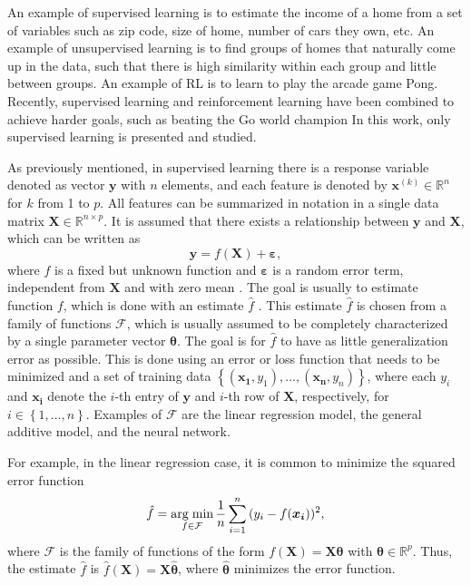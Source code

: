An example of supervised learning is to estimate the income of a home from a set of variables such as zip code, size of home, number of cars they own, etc. An example of unsupervised learning is to find groups of homes that naturally come up in the data, such that there is high similarity within each group and little between groups. An example of RL is to learn to play the arcade game Pong. Recently, supervised learning and reinforcement learning have been combined to achieve harder goals, such as beating the Go world champion \cite{silver2017mastering} In this work, only supervised learning is presented and studied.

As previously mentioned, in supervised learning there is a response variable denoted as vector $\boldsymbol{y}$ with $n$ elements, and each feature is denoted by $\boldsymbol{x}^{(k)} \in \mathbb{R}^n$ for $k$ from 1 to $p$. All features can be summarized in notation in a single data matrix $\boldsymbol{X} \in \mathbb{R}^{n \times p}$. It is assumed that there exists a relationship between $\boldsymbol{y}$ and $\boldsymbol{X}$, which can be written as
\begin{equation}
  \label{eq:general_learning_model}
  \boldsymbol{y} = f(\boldsymbol{X}) + \boldsymbol{\varepsilon},
\end{equation}
where $f$ is a fixed but unknown function and $\boldsymbol{\varepsilon}$ is a random error term, independent from $\boldsymbol{X}$ and with zero mean \cite[p.~16]{james2013introduction}.
The goal is usually to estimate function $f$, which is done with an estimate $\hat{f}$ \cite[p.~17]{james2013introduction}.
This estimate $\hat{f}$ is chosen from a family of functions $\mathcal{F}$, which is usually assumed to be completely characterized by a single parameter vector $\boldsymbol{\theta}$.
The goal is for $\hat{f}$ to have as little generalization error as possible. This is done using an error or loss function that needs to be minimized and a set of training data $\left\{ (\boldsymbol{x_1}, y_1), ..., (\boldsymbol{x_n}, y_n) \right\}$, where each $y_i$ and $\boldsymbol{x_i}$ denote the $i$-th entry of $\boldsymbol{y}$ and $i$-th row of $\boldsymbol{X}$, respectively, for $i \in \left\{1, \ldots, n \right\}$.
Examples of $\mathcal{F}$ are the linear regression model, the general additive model, and the neural network.

For example, in the linear regression case, it is common to minimize the squared error function
\begin{equation}
  \hat{f} = \operatorname*{arg\; min}_{f \in \mathcal{F}} \frac{1}{n} \sum_{i = 1}^n{ ( y_i - f(\boldsymbol{x_i}) ) ^ 2},
\end{equation}
where $\mathcal{F}$ is the family of functions of the form $f(\boldsymbol{X}) = \boldsymbol{X}\boldsymbol{\theta}$ with $\boldsymbol{\theta} \in \mathbb{R}^p$. Thus, the  estimate $\hat{f}$ is $\hat{f}(\boldsymbol{X}) = \boldsymbol{X} \hat{\boldsymbol{\theta}}$, where $\hat{\boldsymbol{\theta}}$ minimizes the error function.

